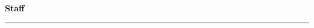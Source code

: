 \clearpage
\thispagestyle{frontmatter}

\vspace*{0.5cm}

\begin{center}
  {\LARGE\bfseries\color{cmjcrimson}Staff}\label{art:staff}
\end{center}

\vspace{0.3cm}
\noindent\textcolor{cmjgold}{\rule{\textwidth}{1.2pt}}
\vspace{0.8cm}